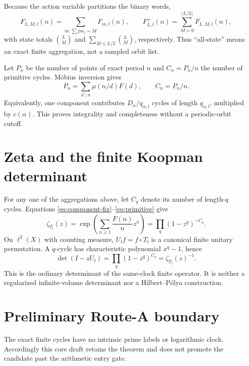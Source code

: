 \documentclass[10pt]{article}
\newif\ifroundzero
\begin{document}
\ifroundzero
Equation \eqref{eq:level-fix} is the core aggregation law.  Subsequent
rounds add fixed-mass and full positive-weight sums and audit every boundary.
\else
Because the action variable partitions the binary words,
\begin{equation}\label{eq:global-fix}
F_{L,M,l}(n)=\sum_{m:\sum jm_j=M}F_{m,l}(n),
\qquad
F^+_{L,l}(n)=\sum_{M=0}^{\lfloor L/2\rfloor}F_{L,M,l}(n),
\end{equation}
with state totals $\binom LM$ and
$\sum_{M\le L/2}\binom LM$, respectively.  Thus ``all-state'' means an
exact finite aggregation, not a sampled orbit list.
\fi

Let $P_n$ be the number of points of exact period $n$ and $C_n=P_n/n$ the
number of primitive cycles.  M\"obius inversion gives
\begin{equation}\label{eq:primitive}
P_n=\sum_{d\mid n}\mu(n/d)F(d),\qquad C_n=P_n/n.
\end{equation}
Equivalently, one component contributes $D_\alpha/q_{\alpha,l}$ cycles of
length $q_{\alpha,l}$, multiplied by $c(\alpha)$.  This proves integrality
and completeness without a periodic-orbit cutoff.

\section{Zeta and the finite Koopman determinant}
For any one of the aggregations above, let $C_q$ denote its number of
length-$q$ cycles.  Equations \eqref{eq:component-fix}--\eqref{eq:primitive}
give
\begin{equation}\label{eq:zeta}
\zeta_{T_l}(z)
=\exp\!\left(\sum_{n\ge1}\frac{F(n)}n z^n\right)
=\prod_q(1-z^q)^{-C_q}.
\end{equation}
On $\ell^2(X)$ with counting measure, $U_lf=f\circ T_l$ is a canonical
finite unitary permutation.  A $q$-cycle has characteristic polynomial
$x^q-1$, hence
\begin{equation}\label{eq:koopman}
\det(I-zU_l)=\prod_q(1-z^q)^{C_q}=\zeta_{T_l}(z)^{-1}.
\end{equation}
This is the ordinary determinant of the same-clock finite operator.  It is
neither a regularized infinite-volume determinant nor a Hilbert--P\'olya
construction.

\ifroundzero
\section{Preliminary Route-A boundary}
The exact finite cycles have no intrinsic prime labels or logarithmic clock.
Accordingly this core draft retains the theorem and does not promote the
candidate past the arithmetic entry gate.
\else
\end{document}
